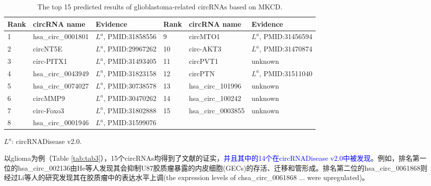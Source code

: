 \documentclass{bioinfo}
\begin{document}
\begin{methods}
\begin{table}[!t]
	\label{tab:05}
    \centering
    \begin{threeparttable}[b]  
        \caption{The top 15 predicted results of glioblastoma-related circRNAs based on MKCD.}	\label{tab:tab5}
        \vspace{0.4cm}
        \setlength{\tabcolsep}{0pt}  %
        \begin{tabular}{p{2cm}<{\centering} p{3.9cm}<{\raggedright} p{4.5cm}<{\raggedright} | p{2cm}<{\centering} p{3.9cm}<{\raggedright} p{4.2cm}<{\raggedright}}
            \hline
            \textbf{Rank} &  \textbf{circRNA name} & \textbf{Evidence} & \textbf{Rank} &  \textbf{circRNA name} & \textbf{Evidence} \\
            \hline
            1 & hsa\_circ\_0001801 & $L^a$, PMID:31858556 & 9 & circMTO1 & $L^a$, PMID:31456594 \\
            2 & circNT5E & $L^a$, PMID:29967262 & 10 & circ-AKT3 & $L^a$, PMID:31470874 \\
            3 & circ-PITX1 & $L^a$, PMID:31493405 & 11 & circPVT1 & unknown \\
            4 & hsa\_circ\_0043949 & $L^a$, PMID:31823158 & 12 & circPTN & $L^a$, PMID:31511040 \\
            5 & hsa\_circ\_0074027 & $L^a$, PMID:30738578 & 13 & hsa\_circ\_101996 & unknown \\
            6 & circMMP9 & $L^a$, PMID:30470262 & 14 & hsa\_circ\_100242 & unknown \\
            7 & circ-Foxo3 & $L^a$, PMID:31802888 & 15 & hsa\_circ\_0003855 & unknown \\
            8 & hsa\_circ\_0001946 & $L^a$, PMID:31599076 & & & \\
            \hline
        \end{tabular}
        \begin{tablenotes}
            \item $L^a$: circRNADisease v2.0.
        \end{tablenotes}
    \end{threeparttable}
    \vspace{-0.4cm}
\end{table}

以glioma为例（Table \ref{tab:tab3}），15个circRNAs均得到了文献的证实，\textcolor{blue}{并且其中的14个在circRNADisease v2.0中被发现}。例如，排名第一位的hsa\_circ\_002136由He等人\cite{he2019fus}发现其会抑制U87胶质瘤暴露的内皮细胞(GECs)的存活、迁移和管形成。排名第二位的hsa\_circ\_0061868则经过Li等人\cite{li2019circ}的研究发现其在胶质瘤中的表达水平上调(the expression levels of chsa\_circ\_0061868 ... were upregulated)。


\end{methods}
\end{document}
